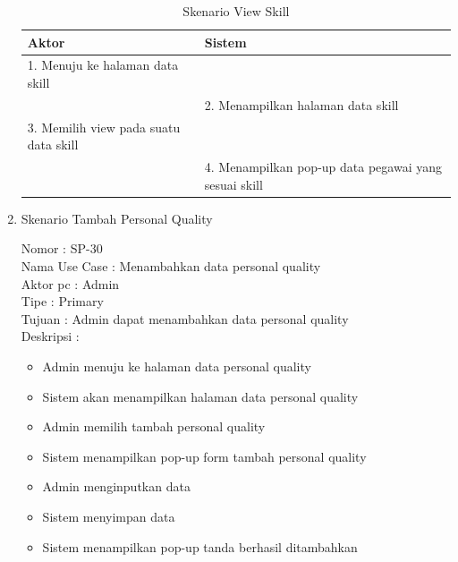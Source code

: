 \begin{enumerate}
\begin{itemize}
\end{itemize}

\begin{table}
	\caption{Skenario View Skill}
	\centering
	\begin{tabular}{ | l | p{65mm}|}
		\hline 
		\textbf{Aktor} & \textbf{Sistem} \\
		\hline
		
		1.	Menuju ke halaman data skill &  \\
		
		\hline
		
		&  2.	Menampilkan halaman data skill \\
		
		\hline
		
		3. Memilih view pada suatu data skill & \\
		
		\hline
		
		& 4.	Menampilkan pop-up data pegawai yang sesuai skill \\
		\hline
		
	\end{tabular}
\end{table}

\item Skenario Tambah Personal Quality

Nomor \kern 3.6pc : SP-30 \\
Nama Use Case : Menambahkan data personal quality \\
Aktor  pc : Admin \\
Tipe \kern 4.6pc : Primary \\
Tujuan \kern 3.6pc : Admin dapat menambahkan data personal quality \\
Deskripsi \kern 2.5pc : 

\begin{itemize}
	\item Admin menuju ke halaman data personal quality
	\item Sistem akan menampilkan halaman data personal quality
	\item Admin memilih tambah personal quality
	\item Sistem menampilkan pop-up form tambah personal quality
	\item Admin menginputkan data
	\item Sistem menyimpan data
	\item Sistem menampilkan pop-up tanda berhasil ditambahkan
	
\end{itemize}


\end{enumerate}
